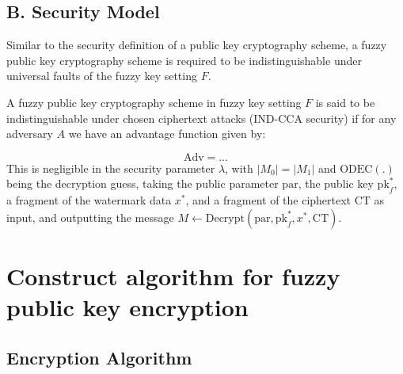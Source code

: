 \documentclass[graybox]{svmult}
\begin{document}
\subsection*{B. Security Model}

Similar to the security definition of a public key cryptography scheme, a fuzzy public key cryptography scheme is required to be indistinguishable under universal faults of the fuzzy key setting $F$.

A fuzzy public key cryptography scheme in fuzzy key setting $F$ is said to be indistinguishable under chosen ciphertext attacks (IND-CCA security) if for any adversary $A$ we have an advantage function given by:

\[
    \text{Adv} = \dots
\]
This is negligible in the security parameter $\lambda$, with $|M_0| = |M_1|$ and $\text{ODEC}(.)$ being the decryption guess, taking the public parameter $\text{par}$, the public key $\text{pk}_f^*$, a fragment of the watermark data $x^*$, and a fragment of the ciphertext $\text{CT}$ as input, and outputting the message $M \leftarrow \text{Decrypt}(\text{par}, \text{pk}_f^*, x^*, \text{CT})$.

\section{Construct algorithm for fuzzy public key encryption}
\subsection{Encryption Algorithm}
\end{document}
